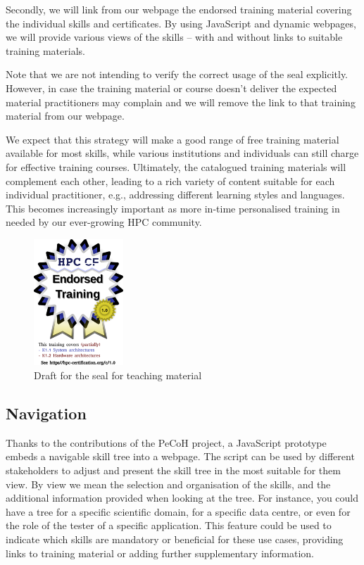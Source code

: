 \documentclass[jocse]{jocseart}
\begin{document}
Secondly, we will link from our webpage the endorsed training material covering the individual skills and certificates.
By using JavaScript and dynamic webpages, we will provide various views of the skills -- with and without links to suitable training materials.

Note that we are not intending to verify the correct usage of the seal explicitly.
However, in case the training material or course doesn't deliver the expected material practitioners may complain and we will remove the link to that training material from our webpage.

We expect that this strategy will make a good range of free training material available for most skills, while various institutions and individuals can still charge for effective training courses.
Ultimately, the catalogued training materials will complement each other, leading to a rich variety of content suitable for each individual practitioner, e.g., addressing different learning styles and languages. This becomes increasingly important as more in-time personalised training in needed by our ever-growing HPC community.

\begin{figure}
  \includegraphics[width=0.3\textwidth]{certified}
  \caption{Draft for the seal for teaching material}
  \label{fig:seal-teaching}
\end{figure}


\subsection{Navigation}

Thanks to the contributions of the PeCoH project, a JavaScript prototype embeds a navigable skill tree into a webpage.
The script can be used by different stakeholders to adjust and present the skill tree in the most suitable for them view.
By view we mean the selection and organisation of the skills, and the additional information provided when looking at the tree.
For instance, you could have a tree for a specific scientific domain, for a specific data centre, or even for the role of the tester of a specific application.
This feature could be used to indicate which skills are mandatory or beneficial for these use cases, providing links to training material or adding further supplementary information.
\end{document}

